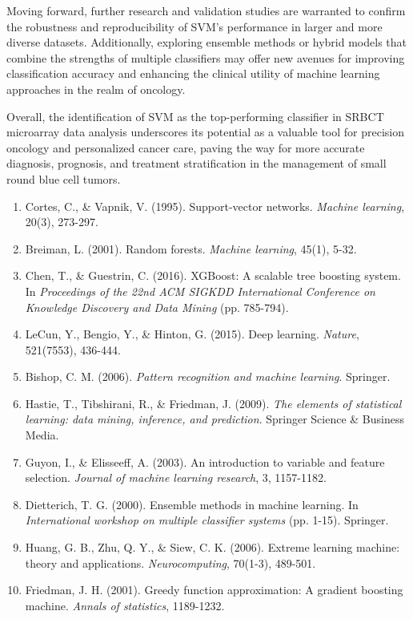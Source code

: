 \documentclass{article}
\begin{document}
Moving forward, further research and validation studies are warranted to confirm the robustness and reproducibility of SVM's performance in larger and more diverse datasets. Additionally, exploring ensemble methods or hybrid models that combine the strengths of multiple classifiers may offer new avenues for improving classification accuracy and enhancing the clinical utility of machine learning approaches in the realm of oncology.

Overall, the identification of SVM as the top-performing classifier in SRBCT microarray data analysis underscores its potential as a valuable tool for precision oncology and personalized cancer care, paving the way for more accurate diagnosis, prognosis, and treatment stratification in the management of small round blue cell tumors.


\begin{enumerate}
\item Cortes, C., \& Vapnik, V. (1995). Support-vector networks. \textit{Machine learning}, 20(3), 273-297.

\item Breiman, L. (2001). Random forests. \textit{Machine learning}, 45(1), 5-32.

\item Chen, T., \& Guestrin, C. (2016). XGBoost: A scalable tree boosting system. In \textit{Proceedings of the 22nd ACM SIGKDD International Conference on Knowledge Discovery and Data Mining} (pp. 785-794).

\item LeCun, Y., Bengio, Y., \& Hinton, G. (2015). Deep learning. \textit{Nature}, 521(7553), 436-444.

\item Bishop, C. M. (2006). \textit{Pattern recognition and machine learning}. Springer.

\item Hastie, T., Tibshirani, R., \& Friedman, J. (2009). \textit{The elements of statistical learning: data mining, inference, and prediction}. Springer Science \& Business Media.

\item Guyon, I., \& Elisseeff, A. (2003). An introduction to variable and feature selection. \textit{Journal of machine learning research}, 3, 1157-1182.

\item Dietterich, T. G. (2000). Ensemble methods in machine learning. In \textit{International workshop on multiple classifier systems} (pp. 1-15). Springer.

\item Huang, G. B., Zhu, Q. Y., \& Siew, C. K. (2006). Extreme learning machine: theory and applications. \textit{Neurocomputing}, 70(1-3), 489-501.

\item Friedman, J. H. (2001). Greedy function approximation: A gradient boosting machine. \textit{Annals of statistics}, 1189-1232.
\end{enumerate}
\end{document}
